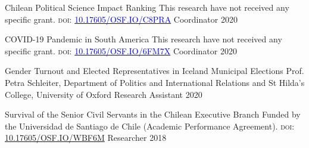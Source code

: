 






\vspace{1mm}

\begin{cvhonors}
\cvhonor
{Chilean Political Science Impact Ranking} 
{This research have not received any specific grant. {\scshape doi:} \href{http://doi.org/10.17605/OSF.IO/C8PRA}{\textcolor{blue}{10.17605/OSF.IO/C8PRA}}} 
{Coordinator}
{2020}
\end{cvhonors}

\vspace{1mm}

\begin{cvhonors}
\cvhonor
{COVID-19 Pandemic in South America}
{This research have not received any specific grant. {\scshape doi:} \href{http://doi.org/10.17605/OSF.IO/6FM7X}{\textcolor{blue}{10.17605/OSF.IO/6FM7X}}}
{Coordinator}
{2020}
\end{cvhonors}

\vspace{1mm}

\begin{cvhonors}
\cvhonor
{Gender Turnout and Elected Representatives in Iceland Municipal Elections}
{Prof. Petra Schleiter, Department of Politics and International Relations and St Hilda's College, University of Oxford}
{Research Assistant}
{2020}
\end{cvhonors}

\vspace{1mm}

\begin{cvhonors}
\cvhonor
{Survival of the Senior Civil Servants in the Chilean Executive Branch}
{Funded by the Universidad de Santiago de Chile (Academic Performance Agreement). {\scshape doi:} \href{http://doi.org/10.17605/OSF.IO/WBF6M}{10.17605/OSF.IO/WBF6M}}
{Researcher}
{2018}
\end{cvhonors}

